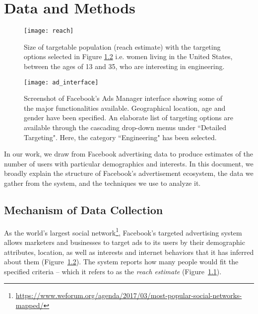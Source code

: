 \chapter{Data and Methods} \label{chap:data}

\begin{figure}

\centering
\texttt{[image: reach]}
\caption{Size of targetable population (reach estimate) with the targeting options selected in Figure \ref{fig:ad_interface} i.e. women living in the United States, between the ages of 13 and 35, who are interesting in engineering.}
\label{fig:reach}

\end{figure}

\begin{figure}
\centering
\texttt{[image: ad\_interface]}
\caption{Screenshot of Facebook's Ads Manager interface showing some of the major functionalities available. Geographical location, age and gender have been specified. An elaborate list of targeting options are available through the cascading drop-down menus under ``Detailed Targeting". Here, the category ``Engineering" has been selected.}
\label{fig:ad_interface}

\end{figure}

In our work, we draw from Facebook advertising data to produce estimates of the number of users with particular demographics and interests. In this document, we broadly explain the structure of Facebook's advertisement ecosystem, the data we gather from the system, and the techniques we use to analyze it.


\section{Mechanism of Data Collection} \label{sec:fb_ad_eco}

As the world's largest social network\footnote{\url{https://www.weforum.org/agenda/2017/03/most-popular-social-networks-mapped/}}, Facebook's targeted advertising system allows marketers and businesses to target ads to its users by their demographic attributes, location, as well as interests and internet behaviors that it has inferred about them (Figure~\ref{fig:ad_interface}). The system reports how many people would fit the specified criteria -- which it refers to as the \textit{reach estimate} (Figure~\ref{fig:reach}).

